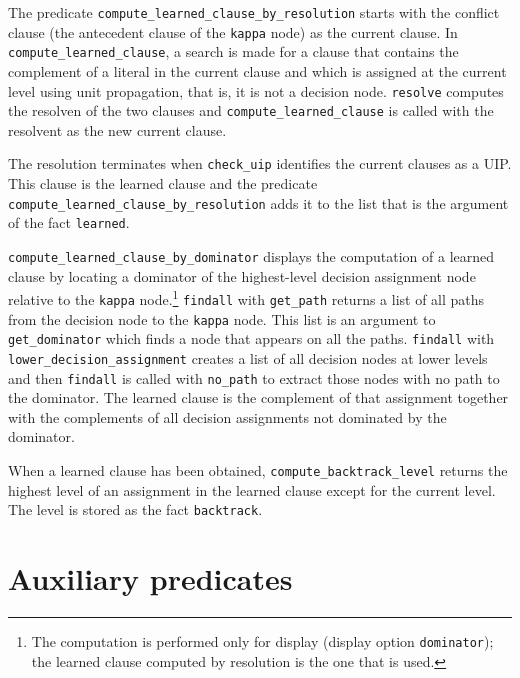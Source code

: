 \documentclass[11pt]{report}
\newcommand*{\p}[1]{\textup{\texttt{#1}}}
\begin{document}
The predicate \p{compute\_learned\_clause\_by\_resolution} starts with
the conflict clause (the antecedent clause of the \p{kappa} node) as the
current clause. In \p{compute\_learned\_clause}, a search is made for a
clause that contains the complement of a literal in the current clause
and which is assigned at the current level using unit propagation, that
is, it is not a decision node. \p{resolve} computes the resolven of the
two clauses and \p{compute\_learned\_clause} is called with the
resolvent as the new current clause.

The resolution terminates when \p{check\_uip} identifies the current
clauses as a UIP. This clause is the learned clause and the predicate
\p{compute\_learned\_clause\_by\_resolution} adds it to the list that is
the argument of the fact \p{learned}.

\p{compute\_learned\_clause\_by\_dominator} displays the computation of
a learned clause by locating a dominator of the highest-level decision
assignment node relative to the \p{kappa} node.\footnote{The computation
is performed only for display (display option \p{dominator}); the
learned clause computed by resolution is the one that is used.}
\p{findall} with \p{get\_path} returns a list of all paths from the
decision node to the \p{kappa} node. This list is an argument to
\p{get\_dominator} which finds a node that appears on all the paths.
\p{findall} with \p{lower\_decision\_assignment} creates a list of all
decision nodes at lower levels and then \p{findall} is called with
\p{no\_path} to extract those nodes with no path to the dominator. The
learned clause is the complement of that assignment together with the
complements of all decision assignments not dominated by the dominator.

When a learned clause has been obtained, \p{compute\_backtrack\_level}
returns the highest level of an assignment in the learned clause except
for the current level. The level is stored as the fact \p{backtrack}.


\section{Auxiliary predicates}\label{s.aux}
\end{document}
